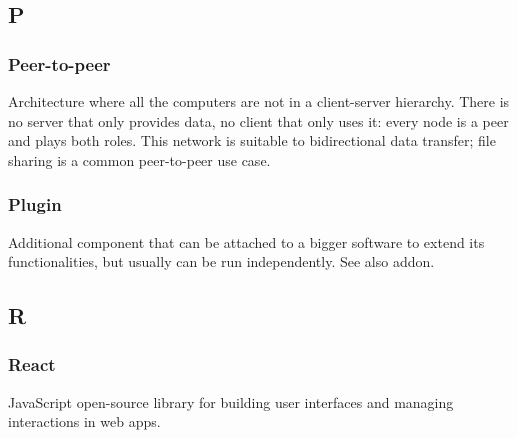 \subsection*{P}

\subsubsection*{Peer-to-peer}
Architecture where all the computers are not in a client-server hierarchy. There is no server that only provides data, no client that only uses it: every node is a peer and plays both roles. This network is suitable to bidirectional data transfer; file sharing is a common peer-to-peer use case.

\subsubsection*{Plugin}
Additional component that can be attached to a bigger software to extend its functionalities, but usually can be run independently. See also addon\glo.





\subsection*{R}

\subsubsection*{React}
JavaScript open-source library for building user interfaces and managing interactions in web apps.


